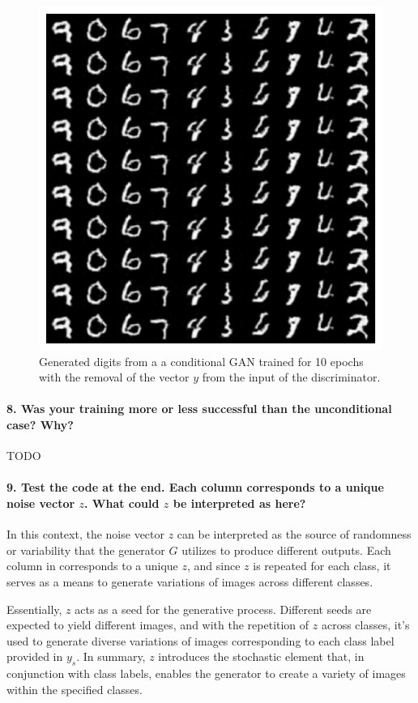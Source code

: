 \begin{figure}[H]
    \centering
    \includegraphics[width=.5\textwidth]{cgan_mnist}
    \caption{Generated digits from a a conditional GAN trained for 10 epochs with the removal of the vector $y$ from the input of the discriminator.}
    \label{fig:cgan_mnist}
\end{figure}

\paragraph*{8. Was your training more or less successful than the unconditional case? Why?}

TODO


\paragraph*{9. Test the code at the end. Each column corresponds to a unique noise vector $z$. What could $z$ be interpreted as here?}

In this context, the noise vector $z$ can be interpreted as the source of randomness or variability that the generator $G$ utilizes to produce different outputs. Each column in  corresponds to a unique $z$, and since $z$ is repeated for each class, it serves as a means to generate variations of images across different classes.

Essentially, $z$ acts as a seed for the generative process. Different seeds are expected to yield different images, and with the repetition of $z$ across classes, it's used to generate diverse variations of images corresponding to each class label provided in $y_s$. In summary, $z$ introduces the stochastic element that, in conjunction with class labels, enables the generator to create a variety of images within the specified classes.


